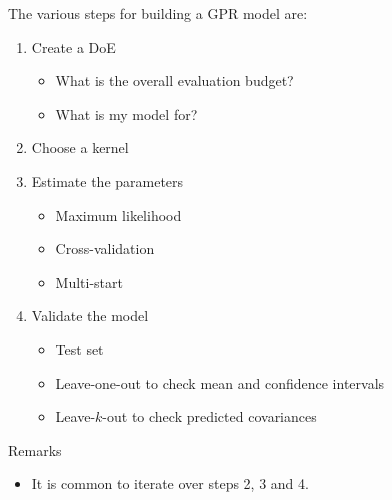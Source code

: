 \documentclass{beamer}
\begin{document}
\begin{frame}{}
The various steps for building a GPR model are:\\ 
\vspace{3mm}
\begin{enumerate}
	\item Create a DoE
		\begin{itemize}
			\item What is the overall evaluation budget?
			\item What is my model for?
		\end{itemize} \vspace{2mm}
	\item Choose a kernel \vspace{3mm}
	\item Estimate the parameters
		\begin{itemize}
			\item Maximum likelihood
			\item Cross-validation
			\item Multi-start
		\end{itemize} \vspace{2mm}
	\item Validate the model 
		\begin{itemize}
			\item Test set 
			\item Leave-one-out to check mean and confidence intervals
			\item Leave-$k$-out to check predicted covariances
		\end{itemize}
\end{enumerate}
\begin{exampleblock}{Remarks}
	\begin{itemize}
		\item It is common to iterate over steps 2, 3 and 4.
	\end{itemize}
\end{exampleblock}
\end{frame}
\end{document}
